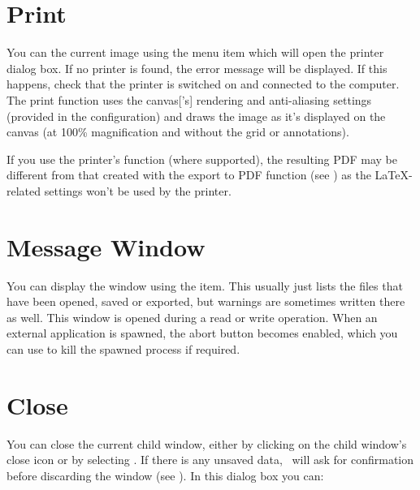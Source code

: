 \section{Print}\label{sec:print}


You can  the current image using the  menu
item which will open the printer dialog box. If no printer is found,
the error message  will
be displayed. If this happens, check that the printer is switched
on and connected to the computer. The print function uses the
\gls{canvas}['s] \gls{rendering} and \gls{anti-aliasing} settings
(provided in the  configuration) and draws
the image as it's displayed on the \gls{canvas} (at 100\%
magnification and without the grid or annotations).

\begin{information}
If you use the printer's  function (where
supported), the resulting PDF may be different from that created
with the export to PDF function (see )
as the \LaTeX-related settings won't be used by the printer.
\end{information}

\section{Message Window}\label{sec:messages}


You can display the  window using the
 item. This usually just lists the
files that have been opened, saved or exported, but warnings are
sometimes written there as well. This window is opened during a read
or write operation. When an external application is spawned, the
abort button becomes enabled, which you can use to kill the spawned
process if required.

\section{Close}\label{sec:closeimage}


You can close the current child window, either by clicking on the
child window's close icon or by selecting .
If there is any unsaved data, \FlowframTk\ will ask for confirmation
before discarding the window (see ).
In this dialog box you can:

